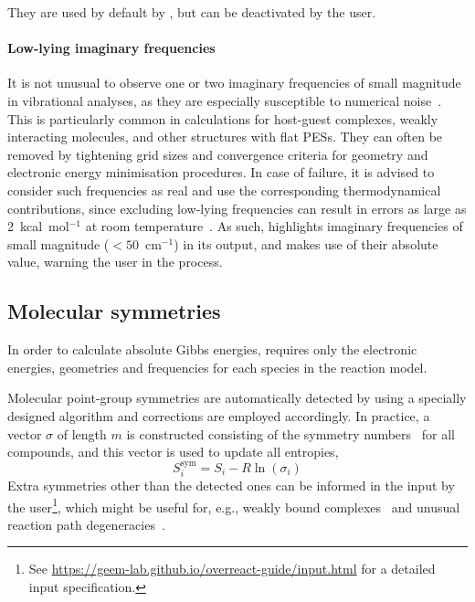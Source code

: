 % 
They are used by default by \overreact,
but can be deactivated by the user.

\paragraph{Low-lying imaginary frequencies}

It is not unusual to observe one or two imaginary frequencies of small magnitude in vibrational analyses,
as they are especially susceptible to numerical noise~\cite{Jensen_2015}.
This is particularly common in calculations for host-guest complexes,
weakly interacting molecules,
and other structures with flat PESs.
They can often be removed by tightening grid sizes and convergence criteria for geometry and electronic energy minimisation procedures.
In case of failure,
it is advised to consider such frequencies as real and use the corresponding thermodynamical contributions,
since excluding low-lying frequencies can result in errors as large as 2~kcal~mol$^{-1}$ at room temperature~\cite{Jensen_2015}.
As such,
\overreact highlights imaginary frequencies of small magnitude ($< 50$~cm$^{-1}$) in its output,
and makes use of their absolute value,
warning the user in the process.

\subsection{Molecular symmetries}%
\label{sec:mol-sym}

In order to calculate absolute Gibbs energies,
\overreact requires only the electronic energies,
geometries and frequencies for each species in the reaction model.

Molecular point-group symmetries are automatically detected by \overreact using a specially designed algorithm
and corrections are employed accordingly.
In practice,
a vector $\sigma$ of length $m$ is constructed consisting of the symmetry numbers~\cite{Fern_ndez_Ramos_2007,Gilson_2010} for all compounds,
and this vector is used to update all entropies,
% 
\begin{equation}
	S_i^\text{sym}
	= S_i - R \ln{\left( \sigma_i \right)}
\end{equation}
% 
Extra symmetries other than the detected ones can be informed in the input by the user\footnote{See \url{https://geem-lab.github.io/overreact-guide/input.html} for a detailed input specification.},
which might be useful for,
e.g.,
weakly bound complexes~\cite{Gilson_2010} and unusual reaction path degeneracies~\cite{Fern_ndez_Ramos_2007}.

